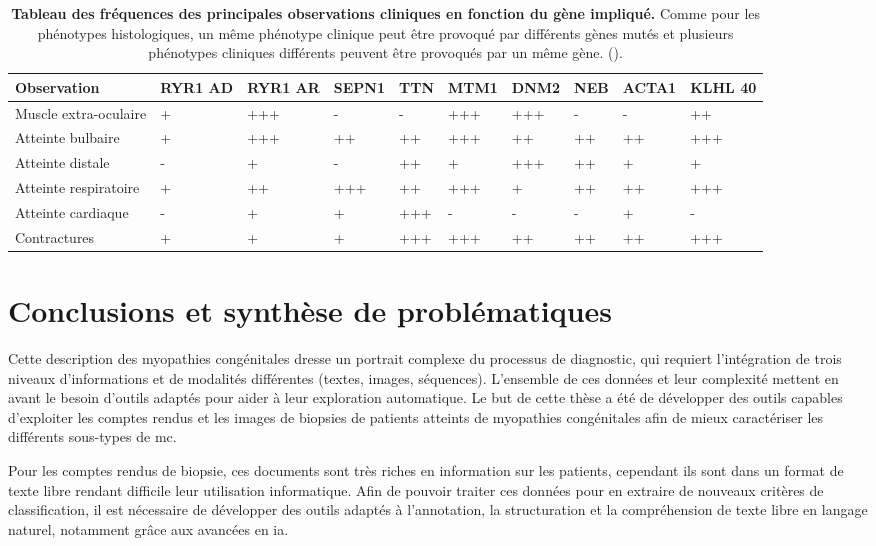 \begin{table}[htbp]
\begin{tabularx}{\textwidth}{|p{1.8cm}|X|X|X|X|X|X|X|X|X|}
 \hline
\textbf{Observation} & \textbf{RYR1 AD} & \textbf{RYR1 AR} & \textbf{SEPN1} & \textbf{TTN} & \textbf{MTM1} & \textbf{DNM2} & \textbf{NEB} & \textbf{ACTA1} & \textbf{KLHL 40} \\
\hline
Muscle extra-oculaire & + & +++ & - & - & +++ & +++ & - & - & ++ \\
\hline
Atteinte bulbaire & + & +++ & ++ & ++ & +++ & ++ & ++ & ++ & +++ \\
\hline
Atteinte distale & - & + & - & ++ & + & +++ & ++ & + & + \\
\hline
Atteinte respiratoire & + & ++ & +++ & ++ & +++ & + & ++ & ++ & +++ \\
\hline
Atteinte cardiaque & - & + & + & +++ & - & - & - & + & - \\
\hline
Contractures & + & + & + & +++ & +++ & ++ & ++ & ++ & +++ \\
\hline
\end{tabularx}
\caption[Tableau des fréquences des principales observations cliniques en fonction du gène impliqué]{\textbf{Tableau des fréquences des principales observations cliniques en fonction du gène impliqué.} Comme pour les phénotypes histologiques, un même phénotype clinique peut être provoqué par différents gènes mutés et plusieurs phénotypes cliniques différents peuvent être provoqués par un même gène. (\cite{jungbluth_congenital_2018}).}
\label{tab:clinic}
\end{table}

\section{Conclusions et synthèse de problématiques}
Cette description des myopathies congénitales dresse un portrait complexe du processus de diagnostic, qui requiert l'intégration de trois niveaux d'informations et de modalités différentes (textes, images, séquences). L'ensemble de ces données et leur complexité mettent en avant le besoin d'outils adaptés pour aider à leur exploration automatique. Le but de cette thèse a été de développer des outils capables d'exploiter les comptes rendus et les images de biopsies de patients atteints de myopathies congénitales afin de mieux caractériser les différents sous-types de \gls{mc}.

Pour les comptes rendus de biopsie, ces documents sont très riches en information sur les patients, cependant ils sont dans un format de texte libre rendant difficile leur utilisation informatique. Afin de pouvoir traiter ces données pour en extraire de nouveaux critères de classification, il est nécessaire de développer des outils adaptés à l'annotation, la structuration et la compréhension de texte libre en langage naturel, notamment grâce aux avancées en \gls{ia}. 

